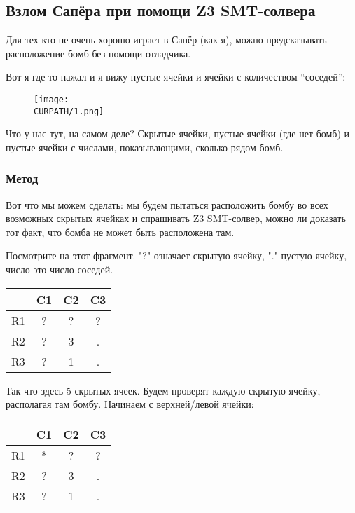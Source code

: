 \subsection{Взлом Сапёра при помощи Z3 SMT-солвера}
\label{minesweeper_SMT}

\renewcommand{\CURPATH}{equations/minesweeper_SMT}

Для тех кто не очень хорошо играет в Сапёр (как я), можно предсказывать расположение бомб без помощи отладчика.

Вот я где-то нажал и я вижу пустые ячейки и ячейки с количеством ``соседей'':

\begin{figure}[H]
\centering
\texttt{[image: \\CURPATH/1.png]}
\end{figure}

Что у нас тут, на самом деле? Скрытые ячейки, пустые ячейки (где нет бомб) и пустые ячейки с числами,
показывающими, сколько рядом бомб.

\subsubsection{Метод}

Вот что мы можем сделать: мы будем пытаться расположить бомбу во всех возможных скрытых ячейках и спрашивать Z3 SMT-солвер,
можно ли доказать тот факт, что бомба не может быть расположена там.

Посмотрите на этот фрагмент. "?" означает скрытую ячейку, "." пустую ячейку, число это число соседей.

\begin{center}
\begin{tabular}{ | c | c | c | c | }
\hline
 & C1 & C2 & C3 \\
\hline
R1 & ? & ? & ? \\
\hline
R2 & ? & 3 & . \\
\hline
R3 & ? & 1 & . \\
\hline
\end{tabular}
\end{center}

Так что здесь 5 скрытых ячеек.
Будем проверят каждую скрытую ячейку, располагая там бомбу.
Начинаем с верхней/левой ячейки:

\begin{center}
\begin{tabular}{ | c | c | c | c | }
\hline
 & C1 & C2 & C3 \\
\hline
R1 & * & ? & ? \\
\hline
R2 & ? & 3 & . \\
\hline
R3 & ? & 1 & . \\
\hline
\end{tabular}
\end{center}

